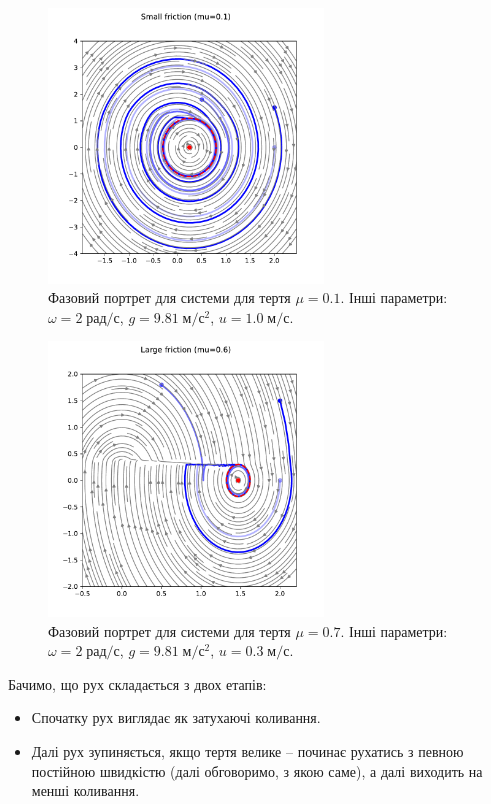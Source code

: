 \documentclass[oneside,solution]{tmpl}
\begin{document}
\begin{figure}
    \centering
    \includegraphics[width=0.65\textwidth]{images/hw_7/small_friction.pdf}
    \caption{Фазовий портрет для системи для тертя $\mu=0.1$. Інші параметри: $\omega=2 \; \text{рад}/\text{с}$, $g=9.81 \; \text{м}/\text{с}^2$, $u=1.0 \; \text{м}/\text{с}$.}
    \label{fig:small_friction}
\end{figure}
\begin{figure}
    \centering
    \includegraphics[width=0.65\textwidth]{images/hw_7/large_friction.pdf}
    \caption{Фазовий портрет для системи для тертя $\mu=0.7$. Інші параметри: $\omega=2 \; \text{рад}/\text{с}$, $g=9.81 \; \text{м}/\text{с}^2$, $u=0.3 \; \text{м}/\text{с}$.}
    \label{fig:large_friction}
\end{figure}

Бачимо, що рух складається з двох етапів:
\begin{itemize}
    \item Спочатку рух виглядає як затухаючі коливання.
    \item Далі рух зупиняється, якщо тертя велике -- починає рухатись з певною постійною швидкістю (далі обговоримо, з якою саме), а далі виходить на менші коливання.
\end{itemize}
\end{document}
